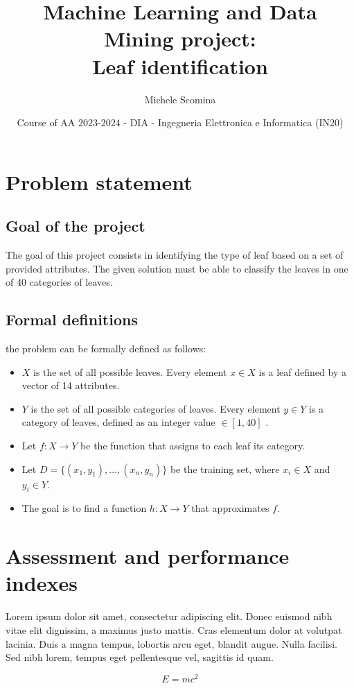 \documentclass{article}
\title{Machine Learning and Data Mining project:\\Leaf identification}
\author[1]{Michele Scomina}
\affil[1]{
    problem statement,
    solution design,
    solution development,
    data gathering,
    writing
}
\date{Course of AA $2023$-$2024$ - DIA - Ingegneria Elettronica e Informatica (IN20)}
\begin{document}
\maketitle



\section{Problem statement}
\subsection{Goal of the project}
The goal of this project consists in identifying the type of leaf based on a set of provided attributes.
The given solution must be able to classify the leaves in one of 40 categories of leaves.

\subsection{Formal definitions}
the problem can be formally defined as follows:
\begin{itemize}
    \item $X$ is the set of all possible leaves. Every element $x \in X$ is a leaf defined by a vector of 14 attributes.
    \item $Y$ is the set of all possible categories of leaves. Every element $y \in Y$ is a category of leaves, defined as an integer value $\in [1,40]$ .
    \item Let $f: X \to Y$ be the function that assigns to each leaf its category.
    \item Let $D = \{(x_1, y_1), \ldots, (x_n, y_n)\}$ be the training set, where $x_i \in X$ and $y_i \in Y$.
    \item The goal is to find a function $h: X \to Y$ that approximates $f$.
\end{itemize}


\section{Assessment and performance indexes}
Lorem ipsum dolor sit amet, consectetur adipiscing elit.
Donec euismod nibh vitae elit dignissim, a maximus justo mattis.
Cras elementum dolor at volutpat lacinia.
Duis a magna tempus, lobortis arcu eget, blandit augue.
Nulla facilisi.
Sed nibh lorem, tempus eget pellentesque vel, sagittis id quam.

\begin{equation}
    E=mc^2
\end{equation}
\end{document}
